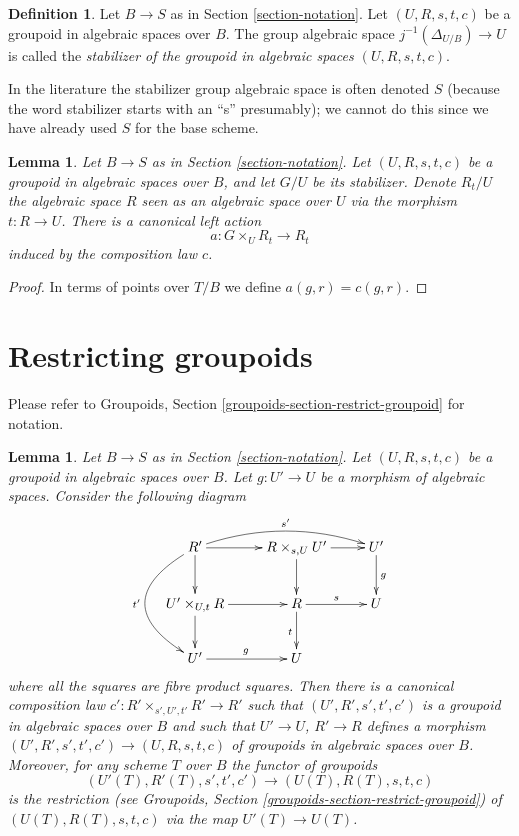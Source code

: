 \documentclass{stacks-project}
\theoremstyle{plain}
\newtheorem{lemma}[subsection]{Lemma}
\theoremstyle{definition}
\newtheorem{definition}[subsection]{Definition}
\theoremstyle{remark}
\numberwithin{equation}{subsection}
\begin{document}
\begin{definition}
\label{definition-stabilizer-groupoid}
Let $B \to S$ as in Section \ref{section-notation}.
Let $(U, R, s, t, c)$ be a groupoid in algebraic spaces over $B$.
The group algebraic space $j^{-1}(\Delta_{U/B}) \to U$ is called the
{\it stabilizer of the groupoid in algebraic spaces $(U, R, s, t, c)$}.
\end{definition}

\noindent
In the literature the stabilizer group algebraic space is often denoted $S$
(because the word stabilizer starts with an ``s'' presumably);
we cannot do this since we have already used $S$ for the base scheme.

\begin{lemma}
\label{lemma-groupoid-action-stabilizer}
Let $B \to S$ as in Section \ref{section-notation}.
Let $(U, R, s, t, c)$ be a groupoid in algebraic spaces over $B$, and let
$G/U$ be its stabilizer. Denote $R_t/U$ the algebraic space $R$ seen as an
algebraic space over $U$ via the morphism $t : R \to U$. There is a
canonical left action
$$
a : G \times_U R_t \longrightarrow R_t
$$
induced by the composition law $c$.
\end{lemma}

\begin{proof}
In terms of points over $T/B$ we define $a(g, r) = c(g, r)$.
\end{proof}








\section{Restricting groupoids}
\label{section-restrict-groupoid}

\noindent
Please refer to
Groupoids, Section \ref{groupoids-section-restrict-groupoid}
for notation.

\begin{lemma}
\label{lemma-restrict-groupoid}
Let $B \to S$ as in Section \ref{section-notation}.
Let $(U, R, s, t, c)$ be a groupoid in algebraic spaces over $B$.
Let $g : U' \to U$ be a morphism of algebraic spaces.
Consider the following diagram
$$
\xymatrix{
R' \ar[d] \ar[r] \ar@/_3pc/[dd]_{t'} \ar@/^1pc/[rr]^{s'}&
R \times_{s, U} U' \ar[r] \ar[d] &
U' \ar[d]^g \\
U' \times_{U, t} R \ar[d] \ar[r] &
R \ar[r]^s \ar[d]_t &
U \\
U' \ar[r]^g &
U
}
$$
where all the squares are fibre product squares. Then there is a
canonical composition law $c' : R' \times_{s', U', t'} R' \to R'$
such that $(U', R', s', t', c')$ is a groupoid in algebraic spaces over
$B$ and such that $U' \to U$, $R' \to R$ defines a morphism
$(U', R', s', t', c') \to (U, R, s, t, c)$ of groupoids in algebraic spaces
over $B$. Moreover, for any scheme $T$ over $B$ the functor of groupoids
$$
(U'(T), R'(T), s', t', c') \to (U(T), R(T), s, t, c)
$$
is the restriction (see
Groupoids, Section \ref{groupoids-section-restrict-groupoid})
of $(U(T), R(T), s, t, c)$ via the map $U'(T) \to U(T)$.
\end{lemma}
\end{document}
